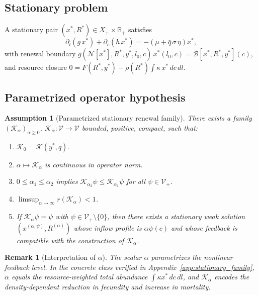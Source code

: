 \documentclass[pdflatex,sn-mathphys-num]{sn-jnl}%
\newtheorem{assumption}[theorem]{Assumption}
\newtheorem{remark}[theorem]{Remark}
\begin{document}
\subsection{Stationary problem}
A stationary pair \((x^\ast,R^\ast)\in X_+\times\mathbb R_+\) satisfies
\begin{equation}\label{eq:stationary_pde}
\partial_l(g\,x^\ast)+\partial_c(h\,x^\ast)
=-(\mu+\bar q\,\sigma\,\eta)x^\ast,
\end{equation}
with renewal boundary
\(g(\mathcal N[x^\ast],R^\ast,y^\ast,l_0,c)\,x^\ast(l_0,c)
=\mathcal B[x^\ast,R^\ast,y^\ast](c)\),
and resource closure
\(0=F(R^\ast,y^\ast)-\rho(R^\ast)\int\kappa\,x^\ast\,dc\,dl\).

\subsection{Parametrized operator hypothesis}
\begin{assumption}[Parametrized stationary renewal family]%
\label{ass:stationary_family}
There exists a family
\((\mathcal K_\alpha)_{\alpha\ge 0}\),
\(\mathcal K_\alpha:\mathcal V\to\mathcal V\)
bounded, positive, compact, such that:
\begin{enumerate}[label=\textup{(F\arabic*)}]
\item\label{ass:F_zero}
\(\mathcal K_0=\mathcal K(y^\ast,\bar q)\).
\item\label{ass:F_cont}
\(\alpha\mapsto \mathcal K_\alpha\) is continuous in operator norm.
\item\label{ass:F_mono}
\(0\le \alpha_1\le \alpha_2\) implies
\(\mathcal K_{\alpha_2}\psi\le \mathcal K_{\alpha_1}\psi\) for all
\(\psi\in\mathcal V_+\).
\item\label{ass:F_limit}
\(\limsup_{\alpha\to\infty}r(\mathcal K_\alpha)<1\).
\item\label{ass:F_rep}
If \(\mathcal K_\alpha\psi=\psi\) with
\(\psi\in\mathcal V_+\setminus\{0\}\),
then there exists a stationary weak solution
\((x^{(\alpha,\psi)},R^{(\alpha)})\)
whose inflow profile is \(\alpha\psi(c)\) and whose feedback
is compatible with the construction of \(\mathcal K_\alpha\).
\end{enumerate}
\end{assumption}

\begin{remark}[Interpretation of \(\alpha\)]
The scalar \(\alpha\) parametrizes the nonlinear feedback level. In the concrete class
verified in Appendix~\ref{app:stationary_family}, \(\alpha\) equals the
resource-weighted total abundance
\(\int\kappa x^\ast\,dc\,dl\), and \(\mathcal K_\alpha\) encodes the
density-dependent reduction in fecundity and increase in mortality.
\end{remark}
\end{document}
